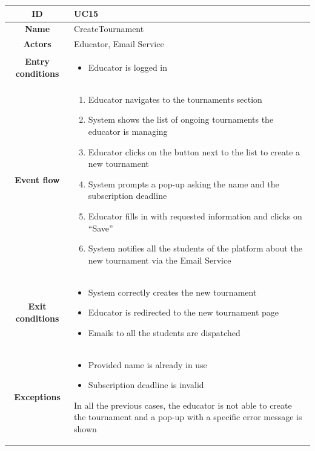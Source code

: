 \begin{center}
    \begin{tabular}{ |c|m{10cm}| }
        \hline
        \textbf{ID} & UC15 \\
        \hline
        \textbf{Name} & CreateTournament \\
        \hline
        \textbf{Actors} & Educator, Email Service \\
        \hline
        \textbf{Entry conditions} &
        \begin{itemize}
            \item Educator is logged in
        \end{itemize} \\
        \hline
        \textbf{Event flow} &
        \begin{enumerate}
            \item Educator navigates to the tournaments section
            \item System shows the list of ongoing tournaments the educator is managing
            \item Educator clicks on the button next to the list to create a new tournament
            \item System prompts a pop-up asking the name and the subscription deadline
            \item Educator fills in with requested information and clicks on “Save”
            \item System notifies all the students of the platform about the new tournament via the Email Service
        \end{enumerate} \\
        \hline
        \textbf{Exit conditions} &
        \begin{itemize}
            \item System correctly creates the new tournament
            \item Educator is redirected to the new tournament page
            \item Emails to all the students are dispatched
        \end{itemize} \\
        \hline
        \textbf{Exceptions} & 
        \begin{itemize}
            \item Provided name is already in use
            \item Subscription deadline is invalid
        \end{itemize} 
        In all the previous cases, the educator is not able to create the tournament and a pop-up with a specific error message is shown \\

\end{tabular}
\end{center}
